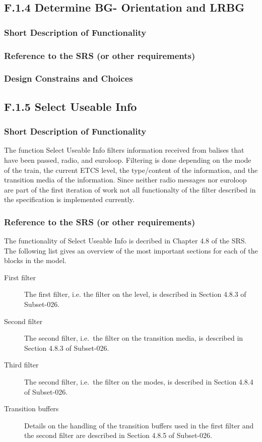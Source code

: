\documentclass{template/openetcs_report}
\begin{document}
\subsection{F.1.4 Determine BG- Orientation and LRBG}

\subsubsection{Short Description of Functionality}
\subsubsection{Reference to the SRS (or other requirements)}
\subsubsection{Design Constrains and Choices}


\subsection{F.1.5 Select Useable Info}

\subsubsection{Short Description of Functionality}
The function Select Useable Info filters information received from balises that have been passed, radio, and euroloop. Filtering is done depending on the mode of the train, the current ETCS level, the type/content of the information, and the transition media of the information. Since neither radio messages nor euroloop are part of the first iteration of work not all functionalty of the filter described in the specification is implemented currently.

\subsubsection{Reference to the SRS (or other requirements)}
The functionality of Select Useable Info is decribed in Chapter 4.8 of the SRS. The following list gives an overview of the most important sections for each of the blocks in the model.

\begin{description}
\item[First filter] The first filter, i.e. the filter on the level, is described in Section 4.8.3 of Subset-026.
\item[Second filter] The second filter, i.e.~the filter on the transition media, is described in Section 4.8.3 of Subset-026.
\item[Third filter]
 The second filter, i.e.~the filter on the modes, is described in Section 4.8.4 of Subset-026.
\item[Transition buffers] Details on the handling of the transition buffers used in the first filter and the second filter are described in Section 4.8.5 of Subset-026.
\end{description}
\end{document}
